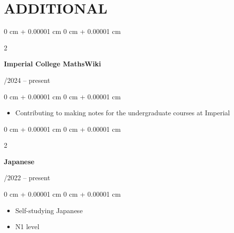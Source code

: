 \documentclass[10pt, letterpaper]{article}
\newenvironment{highlights}{
    \begin{itemize}[
        topsep=0.10 cm,
        parsep=0.10 cm,
        partopsep=0pt,
        itemsep=0pt,
        leftmargin=0 cm + 10pt
    ]
}{
    \end{itemize}
}
\newenvironment{onecolentry}{
    \begin{adjustwidth}{
        0 cm + 0.00001 cm
    }{
        0 cm + 0.00001 cm
    }
}{
    \end{adjustwidth}
}
\newenvironment{twocolentry}[2][]{
    \onecolentry
    \def\secondColumn{#2}
    \setcolumnwidth{\fill, 4.5 cm}
    \begin{paracol}{2}
}{
    \switchcolumn \raggedleft \secondColumn
    \end{paracol}
    \endonecolentry
} %
\begin{document}
        \vspace{0.2 cm}

    \section{ADDITIONAL}

        \begin{twocolentry}{
            10/2024 -- present
        }
            \textbf{Imperial College MathsWiki}
        \end{twocolentry}

        \vspace{0.10 cm}
        \begin{onecolentry}
            \begin{highlights}
                \item Contributing to making notes for the undergraduate courses at Imperial
            \end{highlights}
        \end{onecolentry}

        \vspace{0.2 cm}

                \begin{twocolentry}{
            07/2022 -- present
        }
            \textbf{Japanese}
        \end{twocolentry}

        \vspace{0.10 cm}
        \begin{onecolentry}
            \begin{highlights}
                \item Self-studying Japanese
                \item N1 level
            \end{highlights}
        \end{onecolentry}
\end{document}
